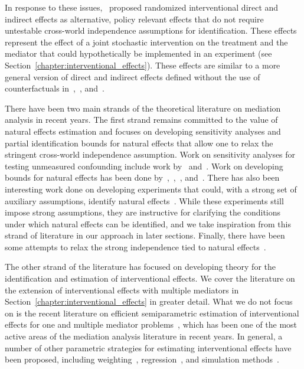 In response to these issues,~\cite{vanderweele2014} proposed randomized interventional direct
and indirect effects as alternative, policy relevant effects that do not require untestable cross-world
independence assumptions for identification. These effects represent the effect of a joint stochastic
intervention on the treatment and the mediator that could hypothetically be implemented in an
experiment (see Section~\ref{chapter:interventional_effects}). These effects are similar to a 
more general version of direct and indirect effects defined without the use of counterfactuals 
in~\cite{didelez2006},~\cite{geneletti2007}, and~\cite{vanderlaanpetersen2008}. 

There have been two main strands of the theoretical literature on mediation analysis in recent years. 
The first strand remains committed to the value of natural effects estimation and focuses on developing
sensitivity analyses and partial identification bounds for natural effects that allow one to relax the 
stringent cross-world independence assumption. Work on sensitivity analyses for testing unmeasured 
confounding include work by~\cite{imaietal2010a} and~\cite{smithvanderweele2019}. Work on developing
bounds for natural effects has been done 
by~\cite{sjolander2009},~\cite{robinsrichardson2010},~\cite{tchetgentchetgenphiri2014}, 
and~\cite{milesetal2017}. There has also been interesting work done on developing
experiments that could, with a strong set of auxiliary assumptions, identify natural
effects~\citep{robinsrichardson2010, imaietal2013}. While these experiments still impose strong
assumptions, they are instructive for clarifying the conditions under which natural effects can 
be identified, and we take inspiration from this strand of literature in our approach in 
later sections. Finally, there have been some attempts to relax the strong independence tied 
to natural effects~\citep{robins2003,petersenetal2006}.

The other strand of the literature has focused on developing theory for the identification and 
estimation of interventional effects. We cover the literature on the extension of interventional 
effects with multiple mediators in Section~\ref{chapter:interventional_effects} in 
greater detail. What we do not focus on is the recent literature on efficient semiparametric 
estimation of interventional 
effects for one and multiple mediator 
problems~\citep{rudolphetal2018,diazetal2021,benkeserran2021,rudolphetal2024}, which has been one
of the most active areas of the mediation analysis literature in recent years. In general, a number
of other parametric strategies for estimating interventional effects have been proposed, including 
weighting~\citep{vanderweeleetal2014}, regression~\citep{vansteelandtdaniel2017}, and simulation 
methods~\citep{vansteelandtdaniel2017}. 

